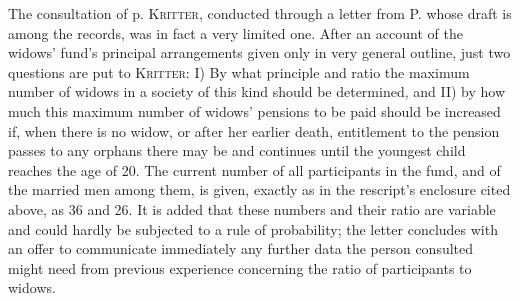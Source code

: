 The consultation of p. \textsc{Kritter}, conducted through a letter from P. whose draft is among the records, was in fact a very limited one. After an account of the widows' fund's principal arrangements given only in very general outline, just two questions are put to \textsc{Kritter}: I) By what principle and ratio the maximum number of widows in a society of this kind should be determined, and II) by how much this maximum number of widows' pensions to be paid should be increased if, when there is no widow, or after her earlier death, entitlement to the pension passes to any orphans there may be and continues until the youngest child reaches the age of 20. The current number of all participants in the fund, and of the married men among them, is given, exactly as in the rescript's enclosure cited above, as 36 and 26. It is added that these numbers and their ratio are variable and could hardly be subjected to a rule of probability; the letter concludes with an offer to communicate immediately any further data the person consulted might need from previous experience concerning the ratio of participants to widows.

